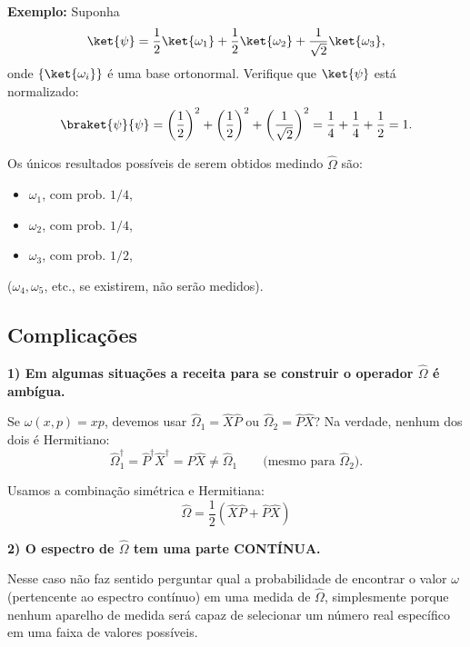 \textbf{Exemplo:} Suponha
\begin{equation}
\ket{\psi} = \frac{1}{2}\ket{\omega_1} + \frac{1}{2}\ket{\omega_2} + \frac{1}{\sqrt{2}}\ket{\omega_3},
\end{equation}
onde $\{\ket{\omega_i}\}$ é uma base ortonormal. Verifique que $\ket{\psi}$ está normalizado:
\begin{equation}
\braket{\psi}{\psi} = \left(\frac{1}{2}\right)^2 + \left(\frac{1}{2}\right)^2 + \left(\frac{1}{\sqrt{2}}\right)^2 = \frac{1}{4} + \frac{1}{4} + \frac{1}{2} = 1.
\end{equation}

Os únicos resultados possíveis de serem obtidos medindo $\hat{\Omega}$ são:
\begin{itemize}
\item $\omega_1$, com prob. $1/4$,
\item $\omega_2$, com prob. $1/4$,
\item $\omega_3$, com prob. $1/2$,
\end{itemize}
($\omega_4, \omega_5$, etc., se existirem, não serão medidos).

\subsection*{Complicações}

\textbf{1) Em algumas situações a receita para se construir o operador $\hat{\Omega}$ é ambígua.}

Se $\omega(x,p) = xp$, devemos usar $\hat{\Omega}_1 = \hat{X}\hat{P}$ ou $\hat{\Omega}_2 = \hat{P}\hat{X}$? Na verdade, nenhum dos dois é Hermitiano:
\begin{equation}
\hat{\Omega}_1^\dagger = \hat{P}^\dagger \hat{X}^\dagger = \hat{P}\hat{X} \neq \hat{\Omega}_1 \qquad \text{(mesmo para } \hat{\Omega}_2\text{)}.
\end{equation}

Usamos a combinação simétrica e Hermitiana:
\begin{equation}
\label{eq:aula11_simetrizacao}
\boxed{\hat{\Omega} = \frac{1}{2}\left(\hat{X}\hat{P} + \hat{P}\hat{X}\right)}
\end{equation}

\textbf{2) O espectro de $\hat{\Omega}$ tem uma parte CONTÍNUA.}

Nesse caso não faz sentido perguntar qual a probabilidade de encontrar o valor $\omega$ (pertencente ao espectro contínuo) em uma medida de $\hat{\Omega}$, simplesmente porque nenhum aparelho de medida será capaz de selecionar um número real específico em uma faixa de valores possíveis.

